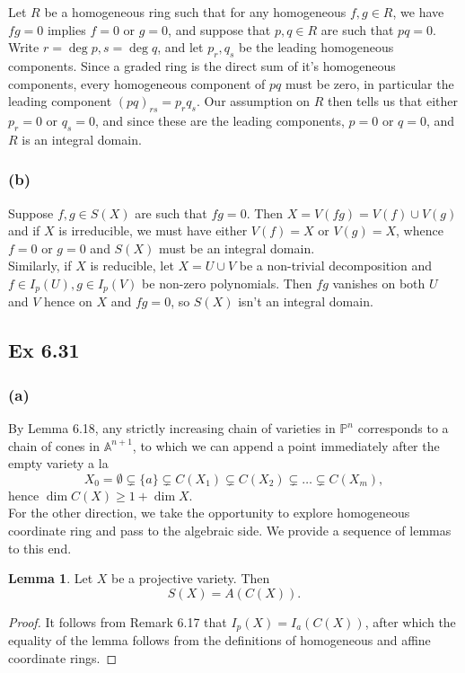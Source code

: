\documentclass{article}
\theoremstyle{definition}
\newtheorem{lemma}[theorem]{Lemma}
\renewcommand{\P}{\mathbb{P}}
\newcommand{\A}{\mathbb{A}}
\renewcommand{\AA}[1]{\A^{#1}}
\newcommand{\PP}[1]{\P^{#1}}
\begin{document}
Let $R$ be a homogeneous ring such that for any homogeneous $f, g \in R$, we
have $fg = 0$ implies $f = 0$ or $g = 0$, and suppose that $p,q \in R$ are such
that $pq = 0$. Write $r = \deg p, s = \deg q$, and let $p_r, q_s$ be the
leading homogeneous components. Since a graded ring is the direct sum of it's
homogeneous components, every homogeneous component of $pq$ must be zero, in
particular the leading component $(pq)_{rs} = p_r q_s$. Our assumption on $R$
then tells us that either $p_r = 0$ or $q_s = 0$, and since these are the
leading components, $p = 0$ or $q = 0$, and $R$ is an integral domain.


\subsubsection*{(b)}

Suppose $f, g \in S(X)$ are such that $fg = 0$. Then $X = V(fg) = V(f) \cup
V(g)$ and if $X$ is irreducible, we must have either $V(f) = X$ or $V(g) = X$,
whence $f = 0$ or $g = 0$ and $S(X)$ must be an integral domain. \\

Similarly, if $X$ is reducible, let $X = U \cup V$ be a non-trivial
decomposition and $f \in I_p(U), g \in I_p(V)$ be non-zero polynomials. Then
$fg$ vanishes on both $U$ and $V$ hence on $X$ and $fg = 0$, so $S(X)$ isn't an
integral domain.

\subsection*{Ex 6.31}

\subsubsection*{(a)}

By Lemma 6.18, any strictly increasing chain of varieties in $\PP{n}$
corresponds to a chain of cones in $\AA{n+1}$, to which we can append a point
immediately after the empty variety
a la
\[
	X_0 = \emptyset \subsetneq \{a\} \subsetneq C(X_1) \subsetneq C(X_2)
	\subsetneq \ldots \subsetneq C(X_m),
\]
hence $\dim C(X) \geq 1 + \dim X$. \\

For the other direction, we take the opportunity to explore homogeneous 
coordinate ring and pass to the algebraic side. We provide a sequence
of lemmas to this end. 

\begin{lemma}
	Let $X$ be a projective variety. Then 
	\[
		S(X) = A(C(X)).
	\] 
\end{lemma}
\begin{proof}
	It follows from Remark 6.17 that $I_p(X) = I_a(C(X))$, after which the
	equality of the lemma follows from the definitions of homogeneous and affine
	coordinate rings.
\end{proof}
\end{document}
